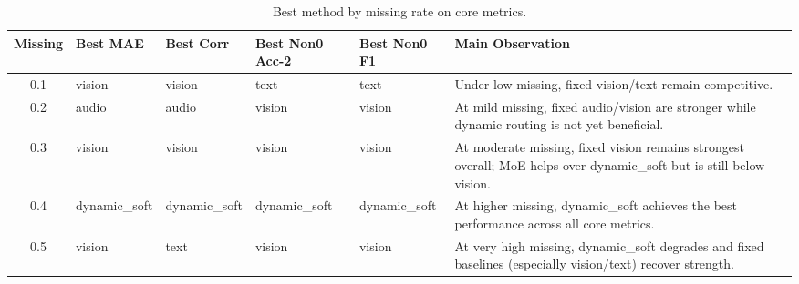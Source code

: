 \begin{table}[t]
\centering
\small
\caption{Best method by missing rate on core metrics.}
\label{tab:best_by_missing}
\begin{tabular}{cllllp{6.5cm}}
\toprule
Missing & Best MAE & Best Corr & Best Non0 Acc-2 & Best Non0 F1 & Main Observation \\
\midrule
0.1 & vision & vision & text & text & Under low missing, fixed vision/text remain competitive. \\
0.2 & audio & audio & vision & vision & At mild missing, fixed audio/vision are stronger while dynamic routing is not yet beneficial. \\
0.3 & vision & vision & vision & vision & At moderate missing, fixed vision remains strongest overall; MoE helps over dynamic_soft but is still below vision. \\
0.4 & dynamic_soft & dynamic_soft & dynamic_soft & dynamic_soft & At higher missing, dynamic_soft achieves the best performance across all core metrics. \\
0.5 & vision & text & vision & vision & At very high missing, dynamic_soft degrades and fixed baselines (especially vision/text) recover strength. \\
\bottomrule
\end{tabular}
\end{table}
